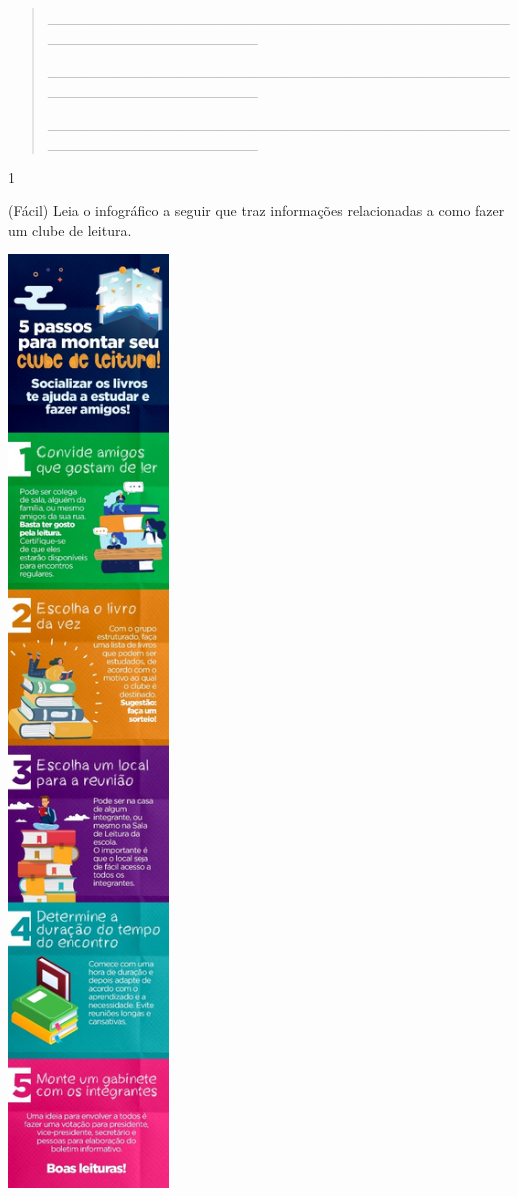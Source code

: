 \begin{escolha}
\begin{escolha}
{\begin{quote}
\_\_\_\_\_\_\_\_\_\_\_\_\_\_\_\_\_\_\_\_\_\_\_\_\_\_\_\_\_\_\_\_\_\_\_\_\_\_\_\_\_\_\_\_\_\_\_\_\_\_\_\_\_\_\_\_\_\_\_\_\_\_\_\_

\_\_\_\_\_\_\_\_\_\_\_\_\_\_\_\_\_\_\_\_\_\_\_\_\_\_\_\_\_\_\_\_\_\_\_\_\_\_\_\_\_\_\_\_\_\_\_\_\_\_\_\_\_\_\_\_\_\_\_\_\_\_\_\_

\_\_\_\_\_\_\_\_\_\_\_\_\_\_\_\_\_\_\_\_\_\_\_\_\_\_\_\_\_\_\_\_\_\_\_\_\_\_\_\_\_\_\_\_\_\_\_\_\_\_\_\_\_\_\_\_\_\_\_\_\_\_\_\_
\end{quote}


\num{1}

(Fácil) Leia o infográfico a seguir que traz informações relacionadas a
como fazer um clube de leitura.

\includegraphics[width=1.67569in,height=9.72500in]{media/image32.jpeg}

}
\end{escolha}
\end{escolha}
